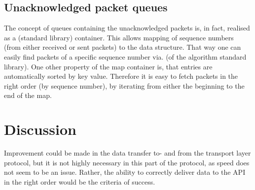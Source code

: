 \subsection{Unacknowledged packet queues}
The concept of queues containing the unacknowledged packets is, in fact, realised as a  (standard library) container. This allows mapping of sequence numbers (from either received or sent packets) to the  data structure. That way one can easily find packets of a specific sequence number via.  (of the algorithm standard library). One other property of the map container is, that entries are automatically sorted by key value. Therefore it is easy to fetch packets in the right order (by sequence number), by iterating from either the beginning to the end of the map.

\section{Discussion}
Improvement could be made in the data transfer to- and from the transport layer protocol, but it is not highly necessary in this part of the protocol, as speed does not seem to be an issue. Rather, the ability to correctly deliver data to the API in the right order would be the criteria of success.